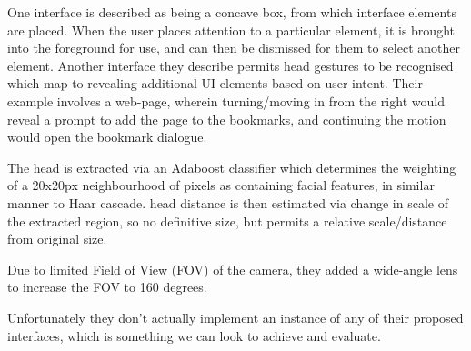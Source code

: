 One interface is described as being a concave box, from which interface elements are placed. When the user places attention to a particular element, it is brought into the foreground for use, and can then be dismissed for them to select another element.
Another interface they describe permits head gestures to be recognised which map to revealing additional UI elements based on user intent. Their example involves a web-page, wherein turning/moving in from the right would reveal a prompt to add the page to the bookmarks, and continuing the motion would open the bookmark dialogue.

The head is extracted via an Adaboost classifier which determines the weighting of a 20x20px neighbourhood of pixels as containing facial features, in similar manner to Haar cascade.
head distance is then estimated via change in scale of the extracted region, so no definitive size, but permits a relative scale/distance from original size.

Due to limited Field of View (FOV) of the camera, they added a wide-angle lens to increase the FOV to 160 degrees.

Unfortunately they don't actually implement an instance of any of their proposed interfaces, which is something we can look to achieve and evaluate.









